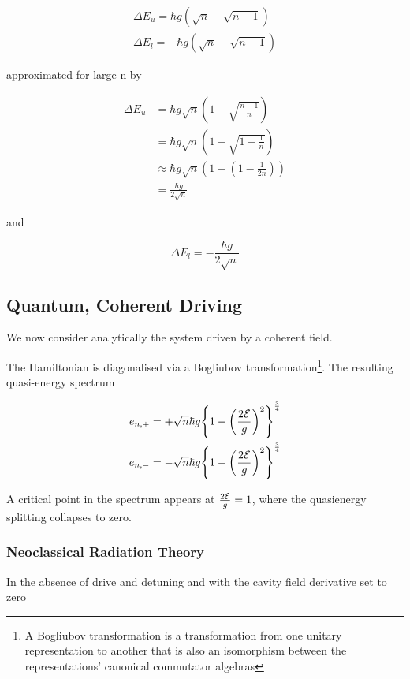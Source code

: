 \begin{align}
  \Delta E_u = \hbar g (\sqrt{n}-\sqrt{n-1}) \\
  \Delta E_l = -\hbar g (\sqrt{n}-\sqrt{n-1})
\end{align}

approximated for large n by

\begin{align}
  \Delta E_u &= \hbar g \sqrt{n} \left (1-\sqrt{\frac{n-1}{n}} \right ) \\
  &= \hbar g \sqrt{n} \left (1-\sqrt{1-\frac{1}{n}} \right ) \\
  & \approx \hbar g \sqrt{n} \left ( 1- \left ( 1 - \frac{1}{2n} \right ) \right ) \\
  &= \frac{\hbar g}{2 \sqrt{n}}
\end{align}

and

\begin{equation}
  \Delta E_l = -\frac{\hbar g}{2 \sqrt{n}}
\end{equation}

\subsection{Quantum, Coherent Driving}
We now consider analytically the system driven by a coherent field.

The Hamiltonian is diagonalised via a Bogliubov transformation\footnote{A Bogliubov transformation is a transformation from one unitary representation to another that is also an isomorphism between the representations' canonical commutator algebras}. The resulting quasi-energy spectrum

\begin{align}
  e_{n, +} &= + \sqrt{n} \hbar g {\left \{1 - {\left ({\frac{2\mathcal{E}}{g}} \right )}^2 \right \}}^{\frac{3}{4}} \\
  e_{n, -} &= - \sqrt{n} \hbar g {\left \{1 - {\left ({\frac{2\mathcal{E}}{g}} \right )}^2 \right \}}^{\frac{3}{4}}
\end{align}

A critical point in the spectrum appears at $\frac{2\mathcal{E}}{g} = 1$, where the quasienergy splitting collapses to zero.

\subsubsection{Neoclassical Radiation Theory}
In the absence of drive and detuning and with the cavity field derivative set to zero

